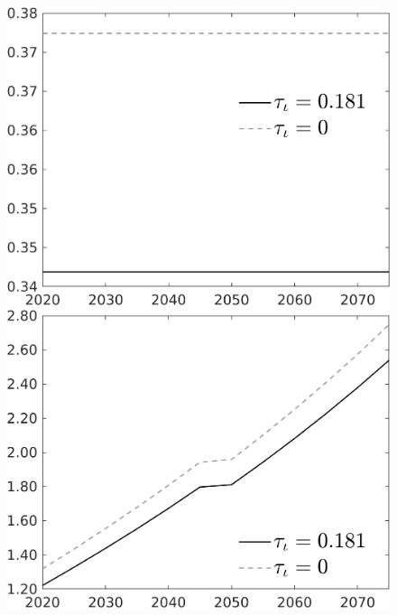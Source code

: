 \documentclass[12pt]{article}
\begin{document}
\begin{figure}[h!!]
\begin{minipage}[]{0.32\textwidth}
	\end{minipage}	
	\begin{minipage}[]{0.32\textwidth}
		\includegraphics[width=1\textwidth]{../../codding_model/own_basedOnFried/optimalPol_010922_revision/figures/all_13Sept22/CompTauf_bytaul_Reg0_hh_spillover0_nsk1_xgr0_knspil0_sep1_LFlimit1_emsbase0_countec0_GovRev0_etaa0.79_lgd1.png}
	\end{minipage}	
	\begin{minipage}[]{0.32\textwidth}
		\includegraphics[width=1\textwidth]{../../codding_model/own_basedOnFried/optimalPol_010922_revision/figures/all_13Sept22/CompTauf_bytaul_Reg0_C_spillover0_nsk1_xgr0_knspil0_sep1_LFlimit1_emsbase0_countec0_GovRev0_etaa0.79_lgd1.png}

\end{minipage}
\end{figure}
\end{document}
